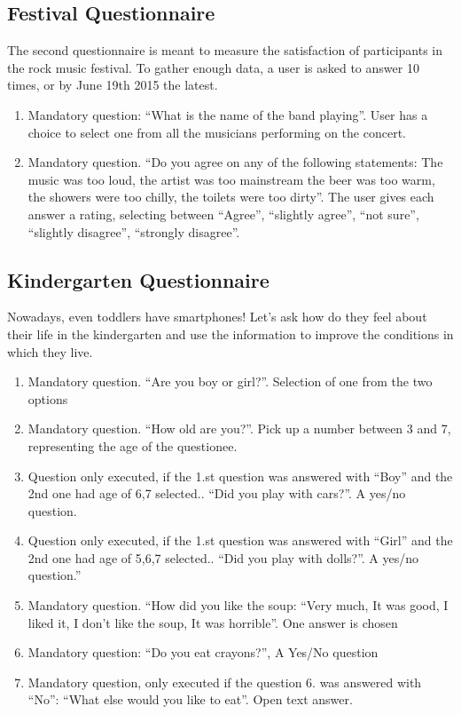 \subsection{Festival Questionnaire}
\label{subsec:festivalquestionnaire}
The second questionnaire is meant to measure the satisfaction of participants in the rock music festival. To gather enough data, a user is asked to answer 10 times, or by June 19th 2015 the latest.
\begin{enumerate}
\item Mandatory question: ``What is the name of the band playing''. User has a choice to select one from all the musicians performing on the concert.
\item Mandatory question. ``Do you agree on any of the following statements: The music was too loud, the artist was too mainstream the beer was too warm, the showers were too chilly, the toilets were too dirty''. The user gives each answer a rating, selecting between ``Agree'', ``slightly agree'', ``not sure'', ``slightly disagree'', ``strongly disagree''.
\end{enumerate}

\subsection{Kindergarten Questionnaire}
\label{subsec:kindergartenquestionnaire}
Nowadays, even toddlers have smartphones! Let's ask how do they feel about their life in the kindergarten and use the information to improve the conditions in which they live.
\begin{enumerate}
  \item Mandatory question. ``Are you boy or girl?''. Selection of one from the two options
  \item Mandatory question. ``How old are you?''. Pick up a number between 3 and 7, representing the age of the questionee.
  \item Question only executed, if the 1.st question was answered with ``Boy'' and the 2nd one had age of 6,7 selected.. ``Did you play with cars?''. A yes/no question.
  \item Question only executed, if the 1.st question was answered with ``Girl'' and the 2nd one had age of 5,6,7 selected.. ``Did you play with dolls?''. A yes/no question.''
  \item Mandatory question. ``How did you like the soup: ``Very much, It was good, I liked it, I don't like the soup, It was horrible''. One answer is chosen
  \item Mandatory question: ``Do you eat crayons?'', A Yes/No question
  \item Mandatory question, only executed if the question 6. was answered with ``No'': ``What else would you like to eat''. Open text answer.
\end{enumerate}
